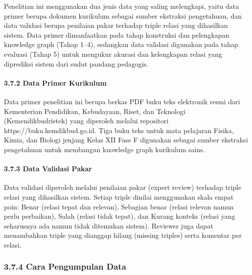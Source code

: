 \documentclass[
]{article}
\begin{document}
Penelitian ini menggunakan dua jenis data yang saling melengkapi, yaitu
data primer berupa dokumen kurikulum sebagai sumber ekstraksi
pengetahuan, dan data validasi berupa penilaian pakar terhadap triple
relasi yang dihasilkan sistem. Data primer dimanfaatkan pada tahap
konstruksi dan pelengkapan knowledge graph (Tahap 1--4), sedangkan data
validasi digunakan pada tahap evaluasi (Tahap 5) untuk mengukur akurasi
dan kelengkapan relasi yang diprediksi sistem dari sudut pandang
pedagogis.

\hypertarget{data-primer-kurikulum}{%
\paragraph{3.7.2 Data Primer Kurikulum}\label{data-primer-kurikulum}}

Data primer penelitian ini berupa berkas PDF buku teks elektronik resmi
dari Kementerian Pendidikan, Kebudayaan, Riset, dan Teknologi
(Kemendikbudristek) yang diperoleh melalui repositori
https://buku.kemdikbud.go.id. Tiga buku teks untuk mata pelajaran
Fisika, Kimia, dan Biologi jenjang Kelas XII Fase F digunakan sebagai
sumber ekstraksi pengetahuan untuk membangun knowledge graph kurikulum
sains.

\hypertarget{data-validasi-pakar}{%
\paragraph{3.7.3 Data Validasi Pakar}\label{data-validasi-pakar}}

Data validasi diperoleh melalui penilaian pakar (expert review) terhadap
triple relasi yang dihasilkan sistem. Setiap triple dinilai menggunakan
skala empat poin: Benar (relasi tepat dan relevan), Sebagian benar
(relasi relevan namun perlu perbaikan), Salah (relasi tidak tepat), dan
Kurang konteks (relasi yang seharusnya ada namun tidak ditemukan
sistem). Reviewer juga dapat menambahkan triple yang dianggap hilang
(missing triples) serta komentar per relasi.

\hypertarget{section-6}{%
\subsubsection{\texorpdfstring{\hfill\break
}{ }}\label{section-6}}

\hypertarget{cara-pengumpulan-data}{%
\subsubsection{3.7.4 Cara Pengumpulan
Data}\label{cara-pengumpulan-data}}
\end{document}
